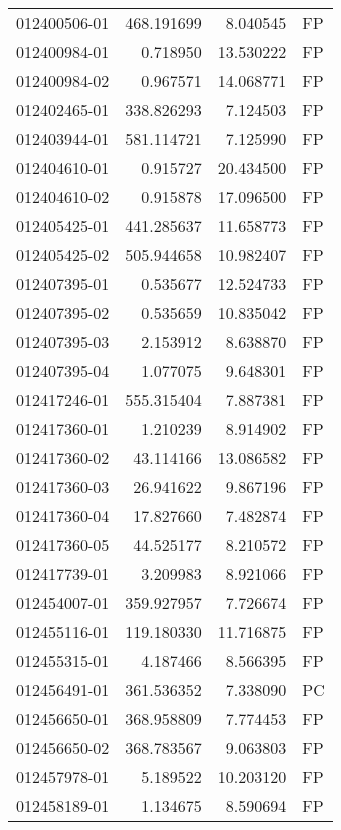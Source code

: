 \begin{tabular}{lrrl}
012400506-01 &  468.191699 &       8.040545 &   FP \\
012400984-01 &    0.718950 &      13.530222 &   FP \\
012400984-02 &    0.967571 &      14.068771 &   FP \\
012402465-01 &  338.826293 &       7.124503 &   FP \\
012403944-01 &  581.114721 &       7.125990 &   FP \\
012404610-01 &    0.915727 &      20.434500 &   FP \\
012404610-02 &    0.915878 &      17.096500 &   FP \\
012405425-01 &  441.285637 &      11.658773 &   FP \\
012405425-02 &  505.944658 &      10.982407 &   FP \\
012407395-01 &    0.535677 &      12.524733 &   FP \\
012407395-02 &    0.535659 &      10.835042 &   FP \\
012407395-03 &    2.153912 &       8.638870 &   FP \\
012407395-04 &    1.077075 &       9.648301 &   FP \\
012417246-01 &  555.315404 &       7.887381 &   FP \\
012417360-01 &    1.210239 &       8.914902 &   FP \\
012417360-02 &   43.114166 &      13.086582 &   FP \\
012417360-03 &   26.941622 &       9.867196 &   FP \\
012417360-04 &   17.827660 &       7.482874 &   FP \\
012417360-05 &   44.525177 &       8.210572 &   FP \\
012417739-01 &    3.209983 &       8.921066 &   FP \\
012454007-01 &  359.927957 &       7.726674 &   FP \\
012455116-01 &  119.180330 &      11.716875 &   FP \\
012455315-01 &    4.187466 &       8.566395 &   FP \\
012456491-01 &  361.536352 &       7.338090 &   PC \\
012456650-01 &  368.958809 &       7.774453 &   FP \\
012456650-02 &  368.783567 &       9.063803 &   FP \\
012457978-01 &    5.189522 &      10.203120 &   FP \\
012458189-01 &    1.134675 &       8.590694 &   FP \\

\end{tabular}
